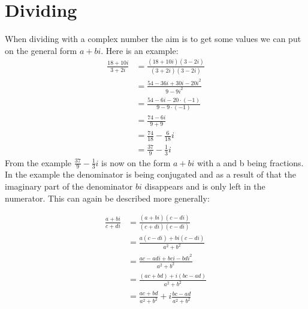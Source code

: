 \section{Dividing}
When dividing with a complex number the aim is to get some values we can put on the general form $a + bi$. Here is an example:
\begin{align*}
\frac{18 + 10i}{3 + 2i} &= \frac{(18 + 10i)(3 - 2i)}{(3+2i)(3-2i)} \\[1em]
&= \frac{54 - 36i + 30i - 20i^2}{9 - 9i^2} \\[1em]
&= \frac{54 - 6i - 20 \cdot (-1)}{9 - 9 \cdot (-1)} \\[1em]
&= \frac{74 - 6i}{9 + 9} \\[1em]
&= \frac{74}{18} - \frac{6}{18}i \\[1em]
&= \frac{37}{9} - \frac{1}{3}i
\end{align*}
From the example $\frac{37}{9} - \frac{1}{3}i$ is now on the form $a+bi$ with a and b being fractions. In the example the denominator is being conjugated and as a result of that the imaginary part of the denominator $bi$ disappears and is only left in the numerator. 
This can again be described more generally:
\begin{center}
\begin{align*}
\frac{a + bi}{c + di} 										
&= \frac{(a+bi)(c-di)}{(c+di)(c-di)} 						\\[1em]
&= \frac{a(c-di)+bi(c-di)}{a^2+b^2} 							\\[1em]
&= \frac{ac-adi+bci-bdi^2}{a^2+b^2}							\\[1em]
&= \frac{(ac+bd)+i(bc-ad)}{a^2+b^2}							\\[1em]
&= \frac{ac+bd}{a^2+b^2}+i \frac{bc-ad}{a^2+b^2}				
\end{align*}
\end{center}
